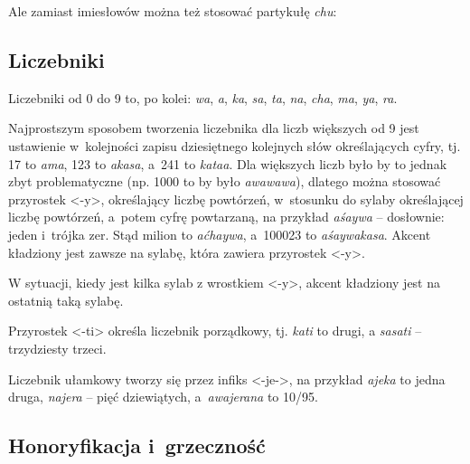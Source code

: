 \begin{spacing}{1.1}

Ale zamiast imiesłowów można też stosować partykułę \emph{chu}:






\subsection{Liczebniki}

Liczebniki od 0 do 9 to, po kolei: \emph{wa}, \emph{a}, \emph{ka}, \emph{sa}, 
\emph{ta}, \emph{na}, \emph{cha}, \emph{ma}, \emph{ya}, \emph{ra}.

Najprostszym sposobem tworzenia liczebnika dla liczb większych od 9 jest 
ustawienie w~kolejności zapisu dziesiętnego kolejnych słów określających cyfry,
tj. 17 to \emph{ama}, 123 to \emph{akasa}, a~241 to \emph{kataa}. Dla większych
liczb było by to jednak zbyt problematyczne (np. 1000 to by było 
\emph{awawawa}), dlatego można stosować przyrostek <-y>, określający liczbę 
powtórzeń, w~stosunku do sylaby określającej liczbę powtórzeń, a~potem cyfrę 
powtarzaną, na przykład \emph{aśaywa} -- dosłownie: jeden i~trójka zer. Stąd 
milion to \emph{aćhaywa}, a~100023 to \emph{aśaywakasa}. Akcent kładziony jest 
zawsze na sylabę, która zawiera przyrostek <-y>.

W sytuacji, kiedy jest kilka sylab z wrostkiem <-y>, akcent kładziony jest na
ostatnią taką sylabę.

Przyrostek <-ti> określa liczebnik porządkowy, tj. \emph{kati} to drugi, 
a \emph{sasati} -- trzydziesty trzeci.

Liczebnik ułamkowy tworzy się przez infiks <-je->, na przykład \emph{ajeka} to 
jedna druga, \emph{najera} -- pięć dziewiątych, a~\emph{awajerana} to 10/95.

\subsection{Honoryfikacja i~grzeczność}


\end{spacing}
